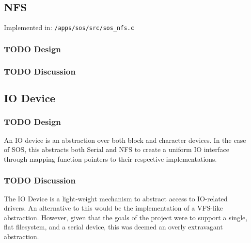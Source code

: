 \documentclass[a4paper,12pt]{article}
\begin{document}
\subsection{NFS}
Implemented in: \texttt{/apps/sos/src/sos\_nfs.c}

\subsubsection{TODO Design}

\subsubsection{TODO Discussion}

\subsection{IO Device}
\subsubsection{TODO Design}
An IO device is an abstraction over both block and character devices.  In the
case of SOS, this abstracts both Serial and NFS to create a uniform IO
interface through mapping function pointers to their respective
implementations.

\subsubsection{TODO Discussion}
The IO Device is a light-weight mechanism to abstract access to IO-related
drivers.  An alternative to this would be the implementation of a VFS-like
abstraction.  However, given that the goals of the project were to support a
single, flat filesystem, and a serial device, this was deemed an overly
extravagant abstraction.
\end{document}
